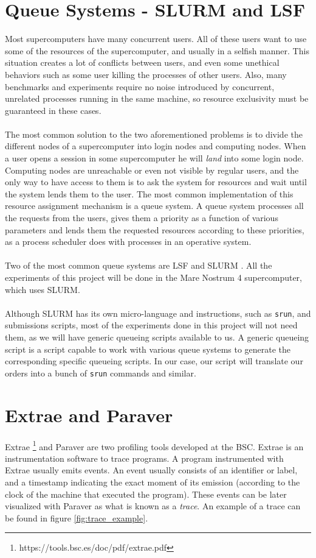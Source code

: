\section{Queue Systems - SLURM and LSF}
\label{subsec:hpc_queues}
Most supercomputers have many concurrent users. All of these users want to use some of the resources of the supercomputer, and usually in a selfish manner. This situation creates a lot of conflicts between users, and even some unethical behaviors such as some user killing the processes of other users. Also, many benchmarks and experiments require no noise introduced by concurrent, unrelated processes running in the same machine, so resource exclusivity must be guaranteed in these cases.\\
\\
The most common solution to the two aforementioned problems is to divide the different nodes of a supercomputer into login nodes and computing nodes. When a user opens a session in some supercomputer he will \textit{land} into some login node. Computing nodes are unreachable or even not visible by regular users, and the only way to have access to them is to ask the system for resources and wait until the system lends them to the user. The most common implementation of this resource assignment mechanism is a queue system. A queue system processes all the requests from the users, gives them a priority as a function of various parameters and lends them the requested resources according to these priorities, as a process scheduler does with processes in an operative system.\\
\\
Two of the most common queue systems are LSF \cite{zhou1992lsf} and SLURM \cite{yoo2003slurm}. All the experiments of this project will be done in the Mare Nostrum 4 supercomputer, which uses SLURM.\\
\\
Although SLURM has its own micro-language and instructions, such as \verb|srun|, and submissions scripts, most of the experiments done in this project will not need them, as we will have generic queueing scripts available to us. A generic queueing script is a script capable to work with various queue systems to generate the corresponding specific queueing scripts. In our case, our script will translate our orders into a bunch of \verb|srun| commands and similar.\\

\section{Extrae and Paraver}
Extrae \footnote{https://tools.bsc.es/doc/pdf/extrae.pdf} and Paraver \cite{paraver} are two profiling tools developed at the BSC. Extrae is an instrumentation software to trace programs. A program instrumented with Extrae usually emits events. An event usually consists of an identifier or label, and a timestamp indicating the exact moment of its emission (according to the clock of the machine that executed the program). These events can be later visualized with Paraver as what is known as a \textit{trace}. An example of a trace can be found in figure \ref{fig:trace_example}.

